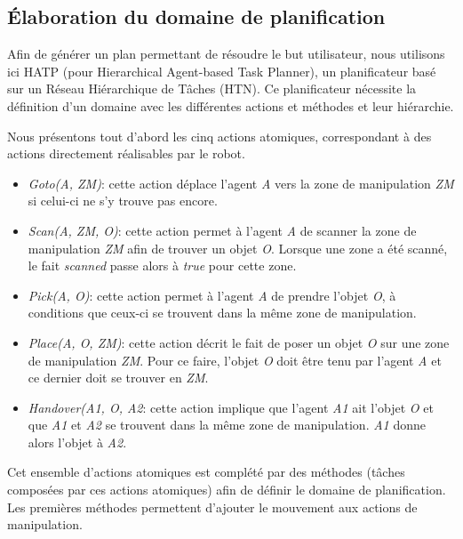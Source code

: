 \documentclass[a4paper,11pt,twoside]{StyleThese}
\begin{document}
\subsection{Élaboration du domaine de planification}
\label{sec:domainehatp}

Afin de générer un plan permettant de résoudre le but utilisateur, nous utilisons ici HATP \cite{lallement14} (pour Hierarchical Agent-based Task Planner), un planificateur basé sur un Réseau Hiérarchique de Tâches (HTN).
Ce planificateur nécessite la définition d'un domaine avec les différentes actions et méthodes et leur hiérarchie.

Nous présentons tout d'abord les cinq actions atomiques, correspondant à des actions directement réalisables par le robot.

\begin{itemize}
\item \textit{Goto(A, ZM)}: cette action déplace l'agent \textit{A} vers la zone de manipulation \textit{ZM} si celui-ci ne s'y trouve pas encore.
\item \textit{Scan(A, ZM, O)}: cette action permet à l'agent \textit{A} de scanner la zone de manipulation \textit{ZM} afin de trouver un objet \textit{O}.
Lorsque une zone a été scanné, le fait \textit{scanned} passe alors à \textit{true} pour cette zone.
\item \textit{Pick(A, O)}: cette action permet à l'agent \textit{A} de prendre l'objet \textit{O}, à conditions que ceux-ci se trouvent dans la même zone de manipulation.
\item \textit{Place(A, O, ZM)}: cette action décrit le fait de poser un objet \textit{O} sur une zone de manipulation \textit{ZM}. Pour ce faire, l'objet \textit{O} doit être tenu par l'agent \textit{A} et ce dernier doit se trouver en \textit{ZM}.
\item \textit{Handover(A1, O, A2}: cette action implique que l'agent \textit{A1} ait l'objet \textit{O} et que \textit{A1} et \textit{A2} se trouvent dans la même zone de manipulation. \textit{A1} donne alors l'objet à \textit{A2}.
\end{itemize}
 
 Cet ensemble d'actions atomiques est complété par des méthodes (tâches composées par ces actions atomiques) afin de définir le domaine de planification.
 Les premières méthodes permettent d'ajouter le mouvement aux actions de manipulation.
 
\end{document}
